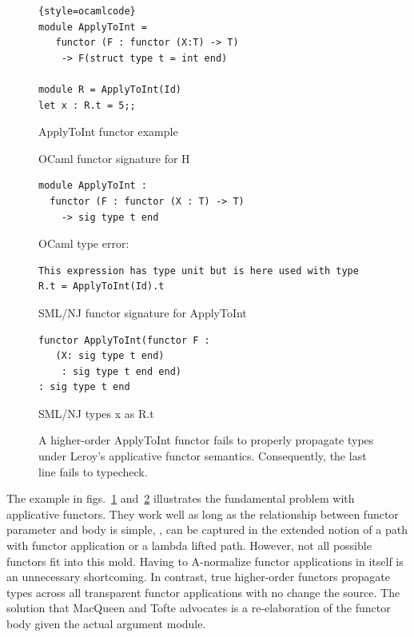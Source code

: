 \documentclass[12pt]{article}
\begin{document}
\begin{figure}
\begin{lstlisting}{style=ocamlcode}
module ApplyToInt = 
   functor (F : functor (X:T) -> T)
    -> F(struct type t = int end)

module R = ApplyToInt(Id)
let x : R.t = 5;;
\end{lstlisting}
\caption{ApplyToInt functor example}
\label{fig:hoapplyfct}
\end{figure}
\begin{figure}
OCaml functor signature for H
\begin{lstlisting}
module ApplyToInt : 
  functor (F : functor (X : T) -> T) 
    -> sig type t end
\end{lstlisting}
OCaml type error:
\begin{verbatim}
This expression has type unit but is here used with type R.t = ApplyToInt(Id).t
\end{verbatim}
SML/NJ functor signature for ApplyToInt
\begin{lstlisting}
functor ApplyToInt(functor F :
   (X: sig type t end) 
    : sig type t end end) 
: sig type t end
\end{lstlisting}
SML/NJ types x as R.t 
\caption{A higher-order ApplyToInt functor fails to properly propagate types under Leroy's applicative functor semantics. Consequently, the last line fails to typecheck.}
\label{fig:hoapplyfctres}
\end{figure}

The example in figs.~\ref{fig:hoapplyfct} and~\ref{fig:hoapplyfctres} illustrates the fundamental problem with applicative functors. They work well as long as the relationship between functor parameter and body is simple, \ie, can be captured in the extended notion of a path with functor application or a lambda lifted path. However, not all possible functors fit into this mold. Having to A-normalize functor applications in itself is an unnecessary shortcoming. In contrast, true higher-order functors propagate types across all transparent functor applications with no change the source. The solution that MacQueen and Tofte \cite{mt94} advocates is a re-elaboration of the functor body given the actual argument module.

\end{document}
